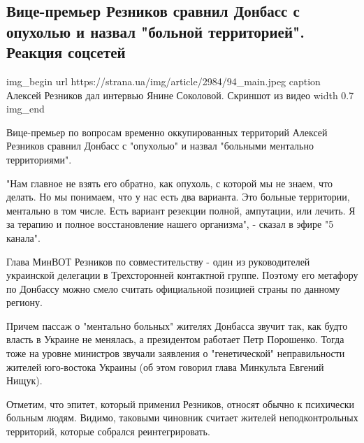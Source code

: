  
 
 

\subsection{Вице-премьер Резников сравнил Донбасс с опухолью и назвал "больной территорией". Реакция соцсетей}
\label{sec:02_11_2020.news.ua.strana.2.reznikov_donbass}


\ifcmt
img_begin 
	url https://strana.ua/img/article/2984/94_main.jpeg
	caption Алексей Резников дал интервью Янине Соколовой. Скриншот из видео 
	width 0.7
img_end
\fi

Вице-премьер по вопросам временно оккупированных территорий Алексей Резников
сравнил Донбасс с "опухолью" и назвал "больными ментально территориями".

"Нам главное не взять его обратно, как опухоль, с которой мы не знаем, что
делать. Но мы понимаем, что у нас есть два варианта. Это больные территории,
ментально в том числе. Есть вариант резекции полной, ампутации, или лечить. Я
за терапию и полное восстановление нашего организма", - сказал в эфире "5
канала".

Глава МинВОТ Резников по совместительству - один из руководителей украинской
делегации в Трехсторонней контактной группе. Поэтому его метафору по Донбассу
можно смело считать официальной позицией страны по данному региону. 

Причем пассаж о "ментально больных" жителях Донбасса звучит так, как будто
власть в Украине не менялась, а президентом работает Петр Порошенко. Тогда тоже
на уровне министров звучали заявления о "генетической" неправильности жителей
юго-востока Украины (об этом говорил глава Минкульта Евгений Нищук). 

Отметим, что эпитет, который применил Резников, относят обычно к психически
больным людям. Видимо, таковыми чиновник считает жителей неподконтрольных
территорий, которые собрался реинтегрировать. 

